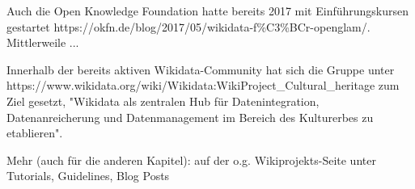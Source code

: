 \documentclass{article}
\begin{document}
Auch die Open Knowledge Foundation hatte bereits 2017 mit Einführungskursen gestartet https://okfn.de/blog/2017/05/wikidata-f\%C3\%BCr-openglam/. Mittlerweile ...


Innerhalb der bereits aktiven Wikidata-Community hat sich die Gruppe unter https://www.wikidata.org/wiki/Wikidata:WikiProject\_Cultural\_heritage zum Ziel gesetzt, "Wikidata als zentralen Hub für Datenintegration, Datenanreicherung und Datenmanagement im Bereich des Kulturerbes zu etablieren". \autocite{noauthor_wikidatawikiproject_nodate}


Mehr (auch für die anderen Kapitel): auf der o.g. Wikiprojekts-Seite unter Tutorials, Guidelines, Blog Posts 


\printbibliography[title={Literaturverzeichnis}]
\end{document}

